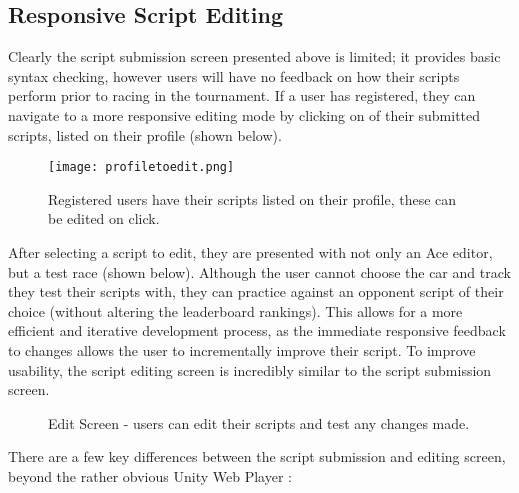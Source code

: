 \subsection{Responsive Script Editing}

Clearly the script submission screen presented above is limited; it provides basic syntax checking, however users will have no feedback on how their scripts perform prior to racing in the tournament. If a user has registered, they can navigate to a more responsive editing mode by clicking on of their submitted scripts, listed on their profile (shown below).

\begin{figure}[H]
\centering
\texttt{[image: profiletoedit.png]}
\caption{Registered users have their scripts listed on their profile, these can be edited on click.}
\end{figure}

After selecting a script to edit, they are presented with not only an Ace editor, but a test race (shown below). Although the user cannot choose the car and track they test their scripts with, they can practice against an opponent script of their choice (without altering the leaderboard rankings). This allows for a more efficient and iterative development process, as the immediate responsive feedback to changes allows the user to incrementally improve their script. To improve usability, the script editing screen is incredibly similar to the script submission screen. 

\begin{figure}[h]
\caption{Edit Screen - users can edit their scripts and test any changes made.}
\end{figure}

There are a few key differences between the script submission and editing screen, beyond the rather obvious Unity Web Player :


